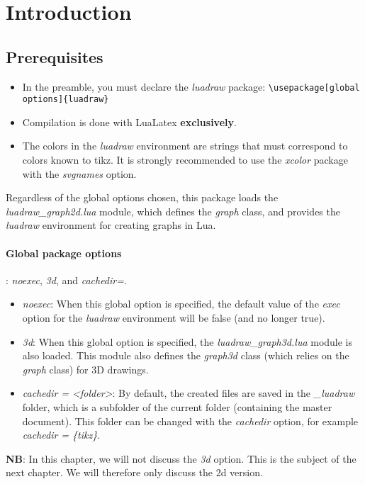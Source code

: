 \section{Introduction}

\subsection{Prerequisites}

\begin{itemize}
\item In the preamble, you must declare the \emph{luadraw} package: \verb|\usepackage[global options]{luadraw}|
\item Compilation is done with LuaLatex \textbf{exclusively}.
\item The colors in the \emph{luadraw} environment are strings that must correspond to colors known to tikz. It is strongly recommended to use the \emph{xcolor} package with the \emph{svgnames} option.
\end{itemize}

Regardless of the global options chosen, this package loads the \emph{luadraw\_graph2d.lua} module, which defines the \emph{graph} class, and provides the \emph{luadraw} environment for creating graphs in Lua.

\paragraph{Global package options}: \emph{noexec}, \emph{3d}, and \emph{cachedir=}.

\begin{itemize}
\item \emph{noexec}: When this global option is specified, the default value of the \emph{exec} option for the \emph{luadraw} environment will be false (and no longer true).
\item \emph{3d}: When this global option is specified, the \emph{luadraw\_graph3d.lua} module is also loaded. This module also defines the \emph{graph3d} class (which relies on the \emph{graph} class) for 3D drawings.
\item \emph{cachedir = <folder>}: By default, the created files are saved in the \emph{\_luadraw} folder, which is a subfolder of the current folder (containing the master document). This folder can be changed with the \emph{cachedir} option, for example \emph{cachedir = \{tikz\}}.
\end{itemize}

\noindent\textbf{NB}: In this chapter, we will not discuss the \emph{3d} option. This is the subject of the next chapter. We will therefore only discuss the 2d version.

